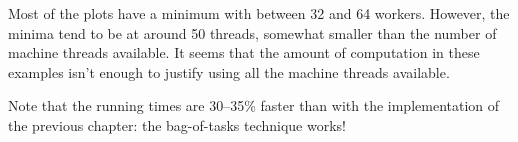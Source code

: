 
\begin{slide}

Most of the plots have a minimum with between 32 and 64 workers.  However,
the minima tend to be at around 50 threads, somewhat smaller than the number
of machine threads available.  It seems that the amount of computation in
these examples isn't enough to justify using all the machine threads
available. 






Note that the running times are 30--35\% faster than with the implementation
of the previous chapter: the bag-of-tasks technique works!
\end{slide}
